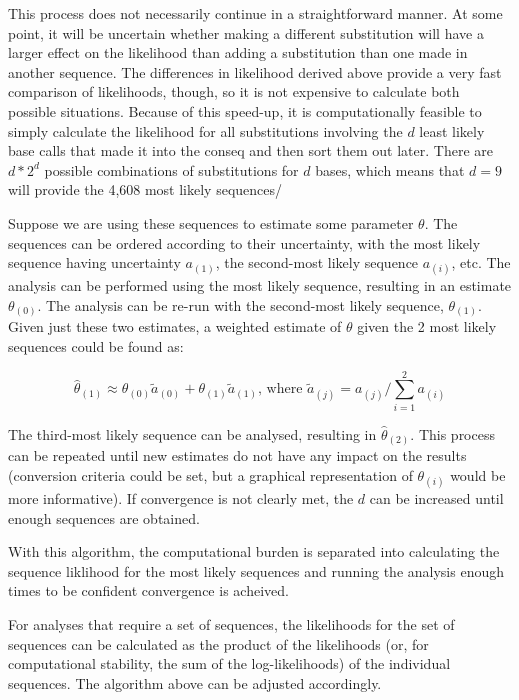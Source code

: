 \documentclass[
]{article}
\begin{document}
This process does not necessarily continue in a straightforward manner.
At some point, it will be uncertain whether making a different
substitution will have a larger effect on the likelihood than adding a
substitution than one made in another sequence. The differences in
likelihood derived above provide a very fast comparison of likelihoods,
though, so it is not expensive to calculate both possible situations.
Because of this speed-up, it is computationally feasible to simply
calculate the likelihood for all substitutions involving the \(d\) least
likely base calls that made it into the conseq and then sort them out
later. There are \(d*2^d\) possible combinations of substitutions for
\(d\) bases, which means that \(d=9\) will provide the 4,608 most likely
sequences/

Suppose we are using these sequences to estimate some parameter
\(\theta\). The sequences can be ordered according to their uncertainty,
with the most likely sequence having uncertainty \(a_{(1)}\), the
second-most likely sequence \(a_{(i)}\), etc. The analysis can be
performed using the most likely sequence, resulting in an estimate
\(\theta_{(0)}\). The analysis can be re-run with the second-most likely
sequence, \(\theta_{(1)}\). Given just these two estimates, a weighted
estimate of \(\theta\) given the 2 most likely sequences could be found
as:

\[
\hat\theta_{(1)} \approx \theta_{(0)} \tilde a_{(0)} + \theta_{(1)}\tilde a_{(1)}\text{, where }\tilde a_{(j)}=a_{(j)}/\sum_{i=1}^2a_{(i)}
\]

The third-most likely sequence can be analysed, resulting in
\(\hat\theta_{(2)}\). This process can be repeated until new estimates
do not have any impact on the results (conversion criteria could be set,
but a graphical representation of \(\theta_{(i)}\) would be more
informative). If convergence is not clearly met, the \(d\) can be
increased until enough sequences are obtained.

With this algorithm, the computational burden is separated into
calculating the sequence liklihood for the most likely sequences and
running the analysis enough times to be confident convergence is
acheived.

For analyses that require a set of sequences, the likelihoods for the
set of sequences can be calculated as the product of the likelihoods
(or, for computational stability, the sum of the log-likelihoods) of the
individual sequences. The algorithm above can be adjusted accordingly.
\end{document}

